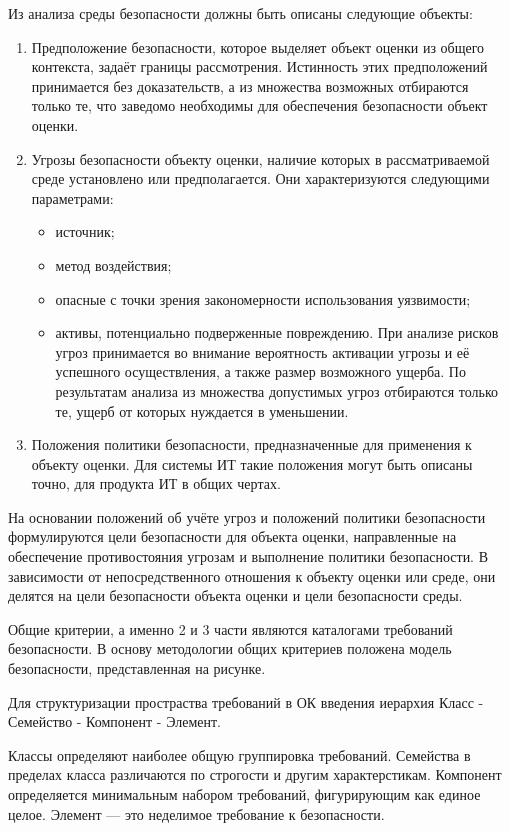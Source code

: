 \documentclass[12pt, russian, oneside, article]{ncc}
\begin{document}
Из анализа среды безопасности должны быть описаны следующие объекты:
\begin{enumerate}
\item Предположение безопасности, которое выделяет объект оценки из общего контекста, задаёт границы рассмотрения. Истинность этих предположений принимается без доказательств, а из множества возможных отбираются только те, что заведомо необходимы для обеспечения безопасности объект оценки.
\item Угрозы безопасности объекту оценки, наличие которых в рассматриваемой среде установлено или предполагается. Они характеризуются следующими параметрами:

\begin{itemize}
\item источник;
\item метод воздействия;
\item опасные с точки зрения закономерности использования уязвимости;
\item активы, потенциально подверженные повреждению. При анализе рисков угроз принимается во внимание вероятность активации угрозы и её успешного осуществления, а также размер возможного ущерба. По результатам анализа из множества допустимых угроз отбираются только те, ущерб от которых нуждается в уменьшении.
\end{itemize}

\item Положения политики безопасности, предназначенные для применения к объекту оценки. Для системы ИТ такие положения могут быть описаны точно, для продукта ИТ в общих чертах.
\end{enumerate}

На основании положений об учёте угроз и положений политики безопасности формулируются цели безопасности для объекта оценки, направленные на обеспечение противостояния угрозам и выполнение политики безопасности. В зависимости от непосредственного отношения к объекту оценки или среде, они делятся на цели безопасности объекта оценки и цели безопасности среды.

Общие критерии, а именно 2 и 3 части являются каталогами требований безопасности. В основу методологии общих критериев положена модель безопасности, представленная на рисунке.

Для структуризации простраства требований в ОК введения иерархия Класс - Семейство - Компонент - Элемент.

Классы определяют наиболее общую группировка требований. Семейства в пределах класса различаются по строгости и другим характерстикам. Компонент определяется минимальным набором требований, фигурирующим как единое целое. Элемент --- это неделимое требование к безопасности.
\end{document}
